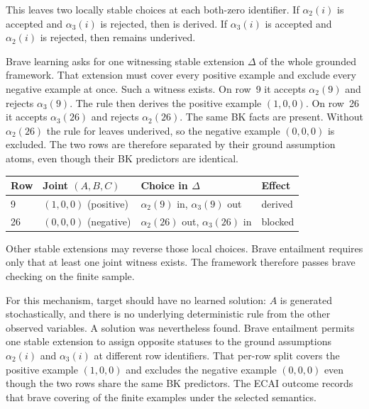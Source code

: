 \documentclass[11pt]{article}
\DeclareRobustCommand{\code}[1]{\texttt{\detokenize{#1}}}
\begin{document}
This leaves two locally stable choices at each both-zero identifier. If
\(\alpha_2(i)\) is accepted and \(\alpha_3(i)\) is rejected, then
\code{a(i)} is derived. If \(\alpha_3(i)\) is accepted and \(\alpha_2(i)\) is
rejected, then \code{a(i)} remains underived.

Brave learning asks for one witnessing stable extension \(\Delta\) of the
whole grounded framework. That extension must cover every positive example and
exclude every negative example at once. Such a witness exists. On row~9 it
accepts \(\alpha_2(9)\) and rejects \(\alpha_3(9)\). The rule
\code{a(9) :- alpha_2(9), b_val_0(9)} then derives the positive example
\((1,0,0)\). On row~26 it accepts \(\alpha_3(26)\) and rejects
\(\alpha_2(26)\). The same BK facts are present. Without \(\alpha_2(26)\) the
rule for \code{a} leaves \code{a(26)} underived, so the negative example
\((0,0,0)\) is excluded. The two rows are therefore separated by their ground
assumption atoms, even though their BK predictors are identical.

\begin{center}
\small
\begin{tabular}{@{}llll@{}}
\toprule
Row & Joint \((A,B,C)\) & Choice in \(\Delta\) & Effect \\
\midrule
9 & \((1,0,0)\) (positive) &
\(\alpha_2(9)\) in, \(\alpha_3(9)\) out &
\code{a(9)} derived \\
26 & \((0,0,0)\) (negative) &
\(\alpha_2(26)\) out, \(\alpha_3(26)\) in &
\code{a(26)} blocked \\
\bottomrule
\end{tabular}
\end{center}

Other stable extensions may reverse those local choices. Brave entailment
requires only that at least one joint witness exists. The framework therefore
passes brave checking on the finite sample.

For this mechanism, target \code{a} should have no learned solution:
\(A\) is generated stochastically, and there is no underlying deterministic
rule from the other observed variables. A solution was nevertheless found.
Brave entailment permits one stable extension to assign opposite statuses to
the ground assumptions \(\alpha_2(i)\) and \(\alpha_3(i)\) at different row
identifiers. That per-row split covers the positive example \((1,0,0)\) and
excludes the negative example \((0,0,0)\) even though the two rows share the
same BK predictors. The ECAI \code{solved} outcome records that brave
covering of the finite examples under the selected semantics.
\end{document}
